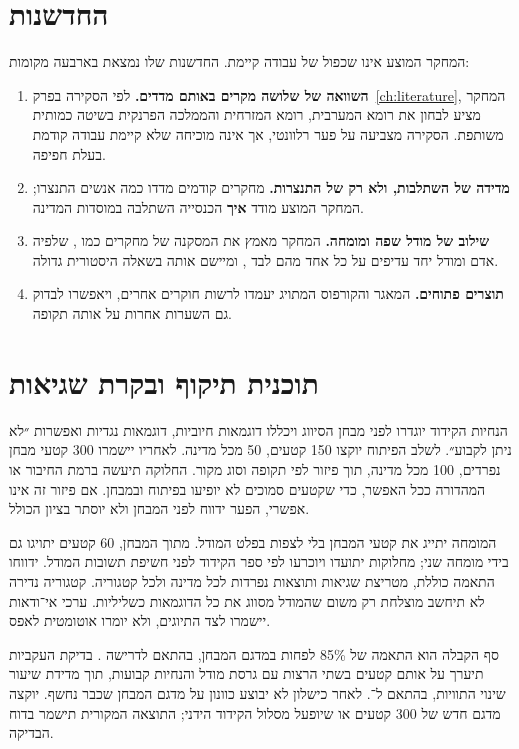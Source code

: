 \section{החדשנות}
\label{sec:alt-innovation}

המחקר המוצע אינו שכפול של עבודה קיימת. החדשנות שלו נמצאת בארבעה מקומות:

\begin{enumerate}
  \item \textbf{השוואה של שלושה מקרים באותם מדדים.} לפי הסקירה בפרק~\ref{ch:literature}, המחקר מציע לבחון את רומא המערבית, רומא המזרחית והממלכה הפרנקית בשיטה כמותית משותפת. הסקירה מצביעה על פער רלוונטי, אך אינה מוכיחה שלא קיימת עבודה קודמת בעלת חפיפה.
  \item \textbf{מדידה של השתלבות, ולא רק של התנצרות.} מחקרים קודמים מדדו כמה אנשים התנצרו; המחקר המוצע מודד \textbf{איך} הכנסייה השתלבה במוסדות המדינה.
  \item \textbf{שילוב של מודל שפה ומומחה.} המחקר מאמץ את המסקנה של מחקרים כמו , שלפיה אדם ומודל יחד עדיפים על כל אחד מהם לבד \cite{assael2022ithaca}, ומיישם אותה בשאלה היסטורית גדולה.
  \item \textbf{תוצרים פתוחים.} המאגר והקורפוס המתויג יעמדו לרשות חוקרים אחרים, ויאפשרו לבדוק גם השערות אחרות על אותה תקופה.
\end{enumerate}


\section{תוכנית תיקוף ובקרת שגיאות}
\label{sec:alt-validation}

הנחיות הקידוד יוגדרו לפני מבחן הסיווג ויכללו דוגמאות חיוביות, דוגמאות נגדיות ואפשרות ״לא ניתן לקבוע״. לשלב הפיתוח יוקצו 150 קטעים, 50 מכל מדינה. לאחריו יישמרו 300 קטעי מבחן נפרדים, 100 מכל מדינה, תוך פיזור לפי תקופה וסוג מקור. החלוקה תיעשה ברמת החיבור או המהדורה ככל האפשר, כדי שקטעים סמוכים לא יופיעו בפיתוח ובמבחן. אם פיזור זה אינו אפשרי, הפער ידווח לפני המבחן ולא יוסתר בציון הכולל.

המומחה יתייג את קטעי המבחן בלי לצפות בפלט המודל. מתוך המבחן, 60 קטעים יתויגו גם בידי מומחה שני; מחלוקות יתועדו ויוכרעו לפי ספר הקידוד לפני חשיפת תשובות המודל. ידווחו התאמה כוללת, מטריצת שגיאות ותוצאות נפרדות לכל מדינה ולכל קטגוריה. קטגוריה נדירה לא תיחשב מוצלחת רק משום שהמודל מסווג את כל הדוגמאות כשליליות. ערכי אי־ודאות יישמרו לצד התיוגים, ולא יומרו אוטומטית לאפס.

סף הקבלה הוא התאמה של 85\% לפחות במדגם המבחן, בהתאם לדרישה . בדיקת העקביות תיערך על אותם קטעים בשתי הרצות עם גרסת מודל והנחיות קבועות, תוך מדידת שיעור שינוי התוויות, בהתאם ל־. לאחר כישלון לא יבוצע כוונון על מדגם המבחן שכבר נחשף. יוקצה מדגם חדש של 300 קטעים או שיופעל מסלול הקידוד הידני; התוצאה המקורית תישמר בדוח הבדיקה.


